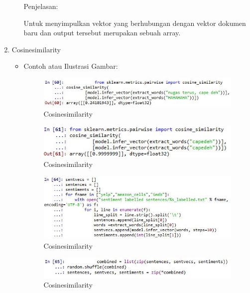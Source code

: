 \begin{enumerate}
\begin{itemize}
Penjelasan:

Untuk menyimpulkan vektor yang berhubungan dengan vektor dokumen baru dan output tersebut merupakan sebuah array.

\end{itemize}

\item Cosinesimilarity
\begin{itemize}
\item Contoh atau Ilustrasi Gambar:

\begin{figure}[H]
\centering
\includegraphics[scale=0.7]{figures/1174051/5/52.jpg}
\caption{Cosinesimilarity}
\label{Cosinesimilarity}
\end{figure}

\begin{figure}[H]
\centering
\includegraphics[scale=0.7]{figures/1174051/5/53.jpg}
\caption{Cosinesimilarity}
\label{Cosinesimilarity}
\end{figure}

\begin{figure}[H]
\centering
\includegraphics[scale=0.7]{figures/1174051/5/54.jpg}
\caption{Cosinesimilarity}
\label{Cosinesimilarity}
\end{figure}

\begin{figure}[H]
\centering
\includegraphics[scale=0.7]{figures/1174051/5/55.jpg}
\caption{Cosinesimilarity}
\label{Cosinesimilarity}
\end{figure}


\end{itemize}
\end{enumerate}
